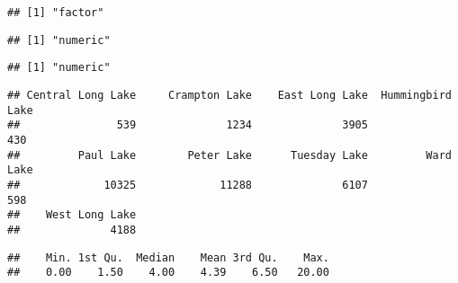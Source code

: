 \documentclass[]{article}
\newenvironment{Shaded}{\begin{snugshade}}{\end{snugshade}}
\newcommand{\KeywordTok}[1]{\textcolor[rgb]{0.13,0.29,0.53}{\textbf{#1}}}
\newcommand{\CommentTok}[1]{\textcolor[rgb]{0.56,0.35,0.01}{\textit{#1}}}
\newcommand{\OperatorTok}[1]{\textcolor[rgb]{0.81,0.36,0.00}{\textbf{#1}}}
\newcommand{\NormalTok}[1]{#1}
\begin{document}
\begin{verbatim}
## [1] "factor"
\end{verbatim}

\begin{Shaded}
\end{Shaded}

\begin{verbatim}
## [1] "numeric"
\end{verbatim}

\begin{Shaded}
\end{Shaded}

\begin{verbatim}
## [1] "numeric"
\end{verbatim}

\begin{Shaded}
\end{Shaded}

\begin{verbatim}
## Central Long Lake     Crampton Lake    East Long Lake  Hummingbird Lake 
##               539              1234              3905               430 
##         Paul Lake        Peter Lake      Tuesday Lake         Ward Lake 
##             10325             11288              6107               598 
##    West Long Lake 
##              4188
\end{verbatim}

\begin{Shaded}
\end{Shaded}

\begin{verbatim}
##    Min. 1st Qu.  Median    Mean 3rd Qu.    Max. 
##    0.00    1.50    4.00    4.39    6.50   20.00
\end{verbatim}
\end{document}
